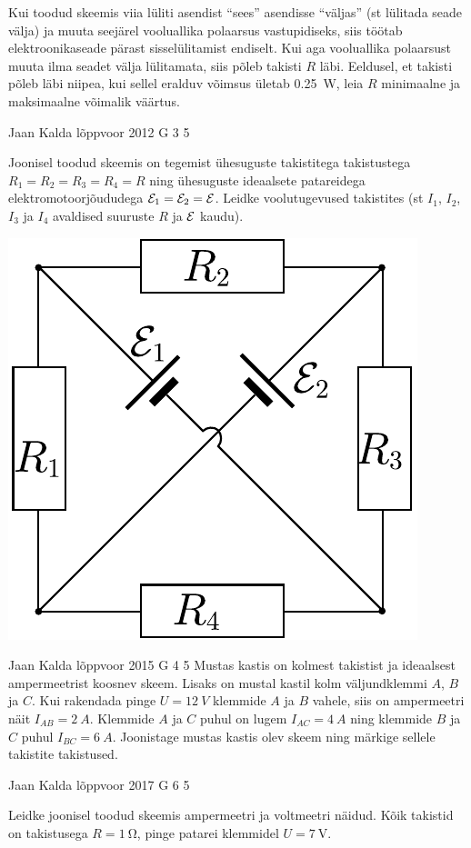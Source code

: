 \documentclass[11pt]{article}
\begin{document}
{{Kui toodud skeemis viia lüliti asendist \enquote{sees} asendisse \enquote{väljas} (st lülitada seade välja) ja muuta seejärel vooluallika polaarsus vastupidiseks, siis töötab elektroonikaseade pärast sisselülitamist endiselt. Kui aga vooluallika polaarsust muuta ilma seadet välja lülitamata, siis põleb takisti $R$ läbi. Eeldusel, et takisti põleb läbi niipea, kui sellel eralduv võimsus ületab \SI{0.25}{\watt}, leia $R$ minimaalne ja maksimaalne võimalik väärtus.
\fi
}

{Jaan Kalda} %
{lõppvoor} %
{2012} %
{G 3} %
{5} %
{
\ifStatement
Joonisel toodud skeemis on tegemist ühesuguste takistitega takistustega $R_1 = R_2 = R_3 = R_4 = R$ ning ühesuguste
ideaalsete patareidega elektromotoorjõududega ${\cal E}_1 = {\cal E}_2
= {\cal E}$. Leidke voolutugevused takistites (st $I_1$, $I_2$, $I_3$ ja
$I_4$ avaldised suuruste $R$ ja ${\cal E}$ kaudu).

\begin{center}
\includegraphics[width=0.35\linewidth]{2012-v3g-03-elektriline_sild}%
\end{center}
\fi
}

{Jaan Kalda} %
{lõppvoor} %
{2015} %
{G 4} %
{5} %
{
\ifStatement
Mustas kastis on kolmest takistist ja ideaalsest ampermeetrist koosnev skeem. Lisaks on mustal kastil kolm väljundklemmi $A$, $B$ ja $C$. Kui rakendada pinge $U=\SI{12}{V}$ klemmide $A$ ja $B$ vahele, siis on ampermeetri näit $I_{AB}=\SI{2}{A}$. Klemmide $A$ ja $C$ puhul on lugem $I_{AC}=\SI{4}{A}$ ning klemmide $B$ ja $C$ puhul $I_{BC}=\SI{6}{A}$. Joonistage mustas kastis olev skeem ning märkige sellele takistite takistused.
\fi
}

{Jaan Kalda} %
{lõppvoor} %
{2017} %
{G 6} %
{5} %
{
\ifStatement
Leidke joonisel toodud skeemis ampermeetri ja voltmeetri näidud. Kõik takistid on takistusega $R=\SI{1}{\ohm}$, pinge patarei klemmidel $U=\SI{7}{\volt}$.

}}
\end{document}
